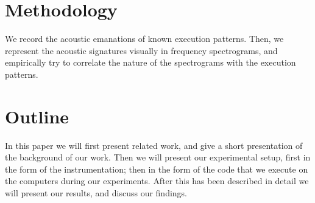 \section{Methodology}
We record the acoustic emanations of known execution patterns.
Then, we represent the acoustic signatures visually in frequency spectrograms, and empirically try to correlate the nature of the spectrograms with the execution patterns.

\section{Outline}
In this paper we will first present related work, and give a short presentation of the background of our work.
Then we will present our experimental setup, first in the form of the instrumentation; then in the form of the code that we execute on the computers during our experiments.
After this has been described in detail we will present our results, and discuss our findings.
